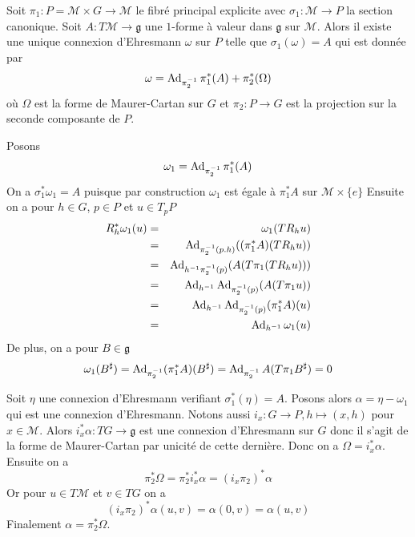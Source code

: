 \documentclass[12pt, a4paper]{book}
\begin{document}
\begin{pro}
Soit $\pi_1 : P = \mathcal{M}\times G \to \mathcal{M}$ le fibré principal explicite avec $\sigma_1: \mathcal{M} \to P$ la section canonique. Soit $A: T\mathcal{M} \to \mathfrak{g}$ une $1$-forme à valeur dans $\mathfrak{g}$ sur $\mathcal{M}$. Alors il existe une unique connexion d'Ehresmann $\omega$ sur $P$ telle que $\sigma_1(\omega) = A$ qui est donnée par
$$\omega = \operatorname{Ad}_{\pi_2^{-1}}\pi_1^*(A) + \pi_2^*(\Omega)$$
où $\Omega$ est la forme de Maurer-Cartan sur $G$ et $\pi_2: P\to G$ est la projection sur la seconde composante de $P$.
\end{pro}
\begin{preu}
Posons
$$\omega_1 = \operatorname{Ad}_{\pi_2^{-1}}\pi_1^*(A)$$
On a $\sigma_1^*\omega_1 = A$ puisque par construction $\omega_1$ est égale à $\pi_1^*A$ sur $\mathcal{M}\times \{e\}$
Ensuite on a pour $h\in G$, $p\in P$ et $u\in T_pP$
\begin{eqnarray*}
R_h^*\omega_1(u) &=& \omega_1(TR_h u) \\
&=& \operatorname{Ad}_{\pi_2^{-1}(p.h)}((\pi_1^*A)(TR_h u)) \\
&=& \operatorname{Ad}_{h^{-1}\pi_2^{-1}(p)}(A(T\pi_1(TR_h u))) \\
&=& \operatorname{Ad}_{h^{-1}}\operatorname{Ad}_{\pi_2^{-1}(p)}(A(T\pi_1 u)) \\
&=& \operatorname{Ad}_{h^{-1}}\operatorname{Ad}_{\pi_2^{-1}(p)}(\pi_1^* A)(u) \\
&=& \operatorname{Ad}_{h^{-1}}\omega_1(u)
\end{eqnarray*}
De plus, on a pour $B\in \mathfrak{g}$ 
$$\omega_1(B^\sharp) = \operatorname{Ad}_{\pi_2^{-1}}(\pi_1^*A)(B^\sharp) = \operatorname{Ad}_{\pi_2^{-1}} A(T\pi_1 B^\sharp) = 0$$ 

Soit $\eta$ une connexion d'Ehresmann verifiant $\sigma_1^*(\eta) = A$. Posons alors $\alpha = \eta - \omega_1$ qui est une connexion d'Ehresmann. Notons aussi $i_x: G\to P, h \mapsto (x, h)$ pour $x\in \mathcal{M}$. Alors $i_x^*\alpha: TG \to \mathfrak{g}$ est une connexion d'Ehresmann sur $G$ donc il s'agit de la forme de Maurer-Cartan par unicité de cette dernière. Donc on a $\Omega = i_x^*\alpha$. Ensuite on a 
$$\pi_2^*\Omega = \pi_2^*i_x^*\alpha = (i_x\pi_2)^*\alpha$$
Or pour $u\in T\mathcal{M}$ et $v\in TG$ on a
$$(i_x\pi_2)^*\alpha(u,v) = \alpha(0, v) = \alpha(u, v)$$
Finalement $\alpha = \pi_2^*\Omega$.
\end{preu}
\end{document}
